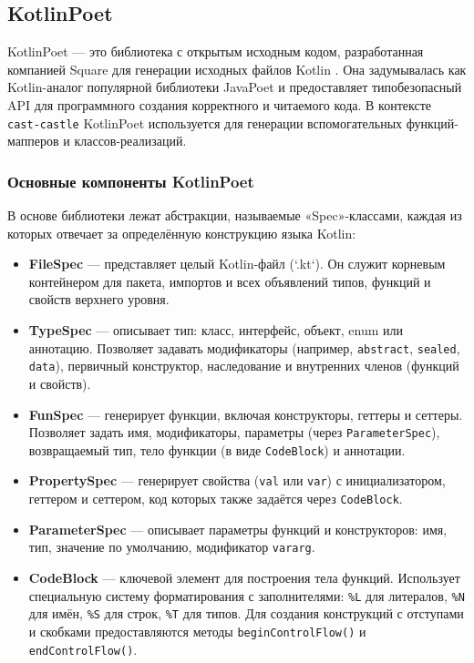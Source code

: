 \subsection{KotlinPoet}

KotlinPoet — это библиотека с открытым исходным кодом, разработанная компанией Square для генерации исходных файлов Kotlin \cite{refg, refk}. Она задумывалась как Kotlin-аналог популярной библиотеки JavaPoet и предоставляет типобезопасный API для программного создания корректного и читаемого кода. В контексте \texttt{cast-castle} KotlinPoet используется для генерации вспомогательных функций-мапперов и классов-реализаций.

\subsubsection{Основные компоненты KotlinPoet}

В основе библиотеки лежат абстракции, называемые «Spec»-классами, каждая из которых отвечает за определённую конструкцию языка Kotlin:

\begin{itemize}
    \item \textbf{FileSpec} — представляет целый Kotlin-файл (`.kt`). Он служит корневым контейнером для пакета, импортов и всех объявлений типов, функций и свойств верхнего уровня.
    \item \textbf{TypeSpec} — описывает тип: класс, интерфейс, объект, enum или аннотацию. Позволяет задавать модификаторы (например, \texttt{abstract}, \texttt{sealed}, \texttt{data}), первичный конструктор, наследование и внутренних членов (функций и свойств).
    \item \textbf{FunSpec} — генерирует функции, включая конструкторы, геттеры и сеттеры. Позволяет задать имя, модификаторы, параметры (через \texttt{ParameterSpec}), возвращаемый тип, тело функции (в виде \texttt{CodeBlock}) и аннотации.
    \item \textbf{PropertySpec} — генерирует свойства (\texttt{val} или \texttt{var}) с инициализатором, геттером и сеттером, код которых также задаётся через \texttt{CodeBlock}.
    \item \textbf{ParameterSpec} — описывает параметры функций и конструкторов: имя, тип, значение по умолчанию, модификатор \texttt{vararg}.
    \item \textbf{CodeBlock} — ключевой элемент для построения тела функций. Использует специальную систему форматирования с заполнителями: \texttt{\%L} для литералов, \texttt{\%N} для имён, \texttt{\%S} для строк, \texttt{\%T} для типов. Для создания конструкций с отступами и скобками предоставляются методы \texttt{beginControlFlow()} и \texttt{endControlFlow()}.
\end{itemize}

